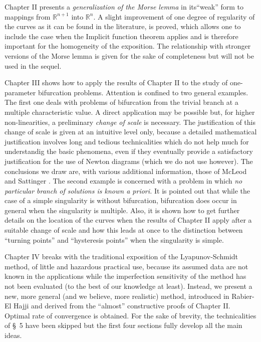 Chapter II presents a {\em generalization of the Morse lemma} in its\break ``weak'' form to mappings from $\mathbb{R}^{n+1}$ into $\mathbb{R}^n$. A slight improvement of one degree of regularity of the curves as it can be found in the literature, is proved, which allows one to include the case when the Implicit function theorem applies and is therefore important for the homogeneity of the exposition. The relationship with stronger versions of the Morse lemma is given for the sake of completeness but will not be used in the sequel. 

Chapter III shows how to apply the results of Chapter II to the study of one-parameter bifurcation problems. Attention is confined to two general examples. The first one deals with problems of bifurcation from the trivial branch at a multiple characteristic value. A direct application may be possible but, for higher non-linearities, a preliminary {\em change of scale} is necessary. The justification of this change of scale is given at an intuitive level only, because a detailed mathematical justification involves long and tedious technicalities which do not help much for understandig the basic phenomena, even if they eventually provide a satisfactory justification for the use of Newton diagrams (which we do not use however). The conclusions we draw are, with various additional information, those of McLeod and Sattinger \cite{23}. The second example is concerned with a problem in which {\em no particular branch of solutions is known a priori.} It is pointed out that while the case of a simple singularity is without bifurcation, bifurcation does occur in general when the singularity is multiple. Also, it is shown how to get further details on the location of the curves when the results of Chapter II apply after a suitable change of scale and how this leads at once to the distinction between ``turning points'' and ``hysteresis points'' when the singularity is simple.

Chapter IV breaks with the traditional exposition of the Lyapunov-Schmidt method, of little and hazardous practical use, because its assumed data are not known in the applications while the imperfection sensitivity of the method has not been evaluated (to the best of our knowledge at least). Instead, we present a new, more general (and we believe, more realistic) method, introduced in Rabier-El Hajji \cite{33} and derived from the ``almost'' constructive  proofs of Chapter II. Optimal rate of convergence is obtained. For the sake of brevity, the technicalities of \S\ 5 have been skipped but the first four sections fully develop all the main ideas.

